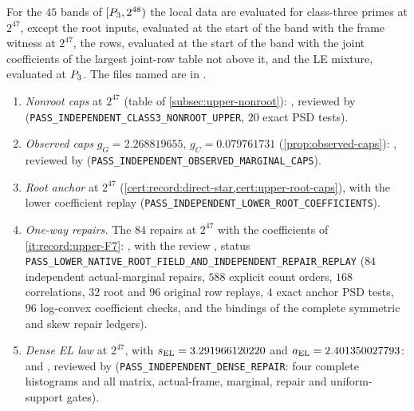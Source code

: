 \begin{certificate}\label{cert:upper-lower-bands}
For the $45$ bands of $[P_3,2^{48})$ the local data are evaluated for
class-three primes at $2^{47}$, except the root inputs, evaluated at the start of
the band with the frame witness at $2^{47}$, the rows, evaluated at the start of the
band with the joint coefficients of the largest joint-row table not above it, and
the LE mixture, evaluated at $P_3$. The files named are in
.
\begin{enumerate}[label=(\alph*)]
\item \emph{Nonroot caps} at $2^{47}$ (table of \cref{subsec:upper-nonroot}):
 , reviewed by 
 (\texttt{PASS\_\allowbreak INDEPENDENT\_\allowbreak CLASS3\_\allowbreak NONROOT\_\allowbreak UPPER}, $20$ exact PSD tests).
\item \emph{Observed caps} $g_G=2.268819655$, $g_C=0.079761731$
 (\cref{prop:observed-caps}): , reviewed by
  (\texttt{PASS\_\allowbreak INDEPENDENT\_\allowbreak OBSERVED\_\allowbreak MARGINAL\_\allowbreak CAPS}).
\item \emph{Root anchor} at $2^{47}$ (\cref{cert:record:direct-star,cert:upper-root-caps}),
 with the lower coefficient replay 
 (\texttt{PASS\_\allowbreak INDEPENDENT\_\allowbreak LOWER\_\allowbreak ROOT\_\allowbreak COEFFICIENTS}).
\item \emph{One-way repairs.} The $84$ repairs at $2^{47}$ with the coefficients of
 \ref{it:record:upper-F7}: , with the review
 , status
 \texttt{PASS\_\allowbreak LOWER\_\allowbreak NATIVE\_\allowbreak ROOT\_\allowbreak FIELD\_\allowbreak AND\_\allowbreak INDEPENDENT\_\allowbreak REPAIR\_\allowbreak REPLAY}
 ($84$ independent actual-marginal repairs, $588$ explicit count orders, $168$
 correlations, $32$ root and $96$ original row replays, $4$ exact anchor PSD tests,
 $96$ log-convex coefficient checks, and the bindings of the complete symmetric and
 skew repair ledgers).
\item \emph{Dense EL law} at $2^{47}$, with $s_{\rm EL}=3.291966120220$ and
 $a_{\rm EL}=2.401350027793$:  and
 , reviewed by 
 (\texttt{PASS\_\allowbreak INDEPENDENT\_\allowbreak DENSE\_\allowbreak REPAIR}: four complete histograms and all matrix,
 actual-frame, marginal, repair and uniform-support gates).

\end{enumerate}
\end{certificate}
